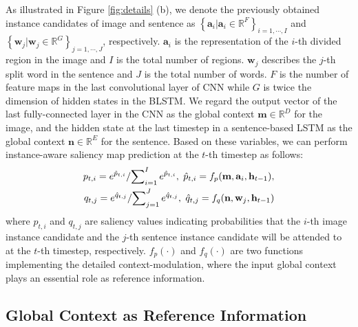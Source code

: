 \documentclass[10pt,twocolumn,letterpaper]{article}
\begin{document}
As illustrated in Figure \ref{fig:details} (b),
we denote the previously obtained instance candidates of image and sentence
as $\left\{ {{{\textbf{a}}_i}}| {{\textbf{a}}_i} \in {\mathbb{R}^{F}}  \right\}_{i=1,\cdots,I}$
and $\left\{ {{{\textbf{w}}_j}}| {{\textbf{w}}_j} \in {\mathbb{R}^{G}}  \right\}_{j=1,\cdots,J}$, respectively.
${{\textbf{a}}_i}$ is the representation of the $i$-th divided region in the image
and $I$ is the total number of regions.
${{\textbf{w}}_j}$ describes the $j$-th split word in the sentence
and $J$ is the total number of words.
$F$ is the number of feature maps in the last convolutional layer of CNN
while $G$ is twice the dimension
of hidden states in the BLSTM.
We regard the output vector of the last fully-connected layer in the CNN
as the global context $\textbf{m} \in {\mathbb{R}^{D}}$ for the image,
and the hidden state at the last timestep in a sentence-based LSTM as
the global context $\textbf{n} \in {\mathbb{R}^{E}}$ for the sentence.
Based on these variables, we can perform
instance-aware saliency map prediction at the $t$-th timestep as follows:
\begin{equation} \label{eqn:e3}
\begin{aligned}
{p_{t,i}} = {{{e^{{{\hat p}_{t,i}}}}}}/{{\sum\nolimits_{i = 1}^I {{e^{{{\hat p}_{t,i}}}}} }}, {\kern 3pt}
{{\hat p}_{t,i}} = {f_{{p}}}(\textbf{m}, {\textbf{a}_i}, {{\textbf{h}}_{t - 1}}), \\
{q_{t,j}} = {{{e^{{{\hat q}_{t,j}}}}}}/{{\sum\nolimits_{j = 1}^J {{e^{{{\hat q}_{t,j}}}}} }}, {\kern 3pt}
{{\hat q}_{t,j}} = {f_{{q}}}(\textbf{n}, {\textbf{w}_j}, {{\textbf{h}}_{t - 1}})
\end{aligned}
\end{equation}
where ${p_{t,i}}$ and ${q_{t,j}}$ are saliency values indicating probabilities that the $i$-th image instance candidate
and the $j$-th sentence instance candidate
will be attended to at the $t$-th timestep, respectively.
$f_{{p}}(\cdot)$ and $f_{{q}}(\cdot)$
are two functions implementing the detailed context-modulation,
where the input global context plays an essential role
as reference information.






\subsection{Global Context as Reference Information}
\end{document}

